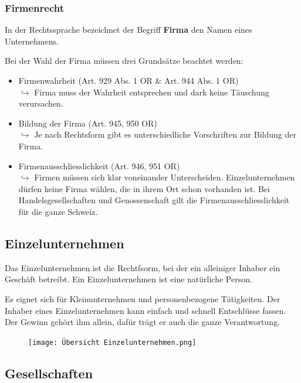 \documentclass[12pt]{article}
\begin{document}
\subsubsection{Firmenrecht}
\begin{Definitionsbox}
    In der Rechtssprache bezeichnet der Begriff \textbf{Firma} den Namen eines Unternehmens.
\end{Definitionsbox}
Bei der Wahl der Firma müssen drei Grundsätze beachtet werden:
\begin{itemize}
    \item Firmenwahrheit (Art. 929 Abs. 1 OR \& Art. 944 Abs. 1 OR)\\
    $\hookrightarrow$ Firma muss der Wahrheit entsprechen und dark keine Täuschung verursachen.
    \item Bildung der Firma (Art. 945, 950 OR)\\
    $\hookrightarrow$ Je nach Rechtsform gibt es unterschiedliche Vorschriften zur Bildung der Firma.
    \item Firmenausschliesslichkeit (Art. 946, 951 OR)\\
    $\hookrightarrow$ Firmen müssen sich klar voneinander Unterscheiden. Einzelunternehmen dürfen keine Firma wählen, die in ihrem Ort schon vorhanden ist. Bei Handelsgesellschaften und Genossenschaft gilt die Firmenausschliesslichkeit für die ganze Schweiz.
\end{itemize}

\newpage
\subsection{Einzelunternehmen}
Das Einzelunternehmen ist die Rechtfsorm, bei der ein alleiniger Inhaber ein Geschäft betreibt. Ein Einzelunternehmen ist eine natürliche Person.

Es eignet sich für Kleinunternehmen und personenbezogene Tätigkeiten. Der Inhaber eines Einzelunternehmen kann einfach und schnell Entschlüsse fassen. Der Gewinn gehört ihm allein, dafür trägt er auch die ganze Verantwortung.

\begin{figure}[h]
    \begin{center}
            \texttt{[image: Übersicht Einzelunternehmen.png]}
    \end{center}
\end{figure}

\subsection{Gesellschaften}
\end{document}
